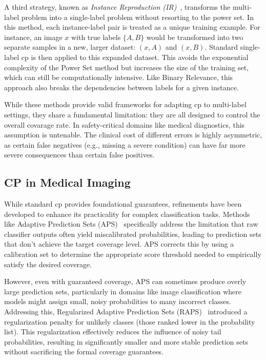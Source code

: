 A third strategy, known as \emph{Instance Reproduction (IR)}~\cite{wang2014mlcp},
transforms the multi-label problem into a single-label problem
without resorting to the power set.
In this method, each instance-label pair is treated as a unique training example.
For instance, an image \(x\) with true labels \(\{A, B\}\)
would be transformed into two separate samples in a new, larger dataset:
\((x, A)\) and \((x, B)\).
Standard single-label \gls{cp} is then applied to this expanded dataset.
This avoids the exponential complexity of the Power Set method
but increases the size of the training set, which can still be computationally intensive.
Like Binary Relevance, this approach also breaks
the dependencies between labels for a given instance.

While these methods provide valid frameworks for adapting \gls{cp} to multi-label settings,
they share a fundamental limitation:
they are all designed to control the overall covarage rate.
In safety-critical domains like medical diagnostics, this assumption is untenable.
The clinical cost of different errors is highly asymmetric, as certain false negatives
(e.g., missing a severe condition) can have far more severe consequences than
certain false positives.

\subsection{CP in Medical Imaging}

While standard \gls{cp} provides foundational guarantees,
refinements have been developed to enhance its practicality for complex classification tasks.
Methods like Adaptive Prediction Sets (APS)~\cite{romano2020aps} specifically address
the limitation that raw classifier outputs often yield miscalibrated probabilities,
leading to prediction sets that don't achieve the target coverage level.
APS corrects this by using a calibration set to determine
the appropriate score threshold needed to empirically satisfy the desired coverage.

However, even with guaranteed coverage,
APS can sometimes produce overly large prediction sets,
particularly in domains like image classification
where models might assign small, noisy probabilities to many incorrect classes.
Addressing this, Regularized Adaptive Prediction Sets (RAPS)~\cite{angelopoulos2020raps}
introduced a regularization penalty for unlikely classes
(those ranked lower in the probability list).
This regularization effectively reduces the influence of noisy tail probabilities,
resulting in significantly smaller and more stable prediction sets
without sacrificing the formal coverage guarantees.

